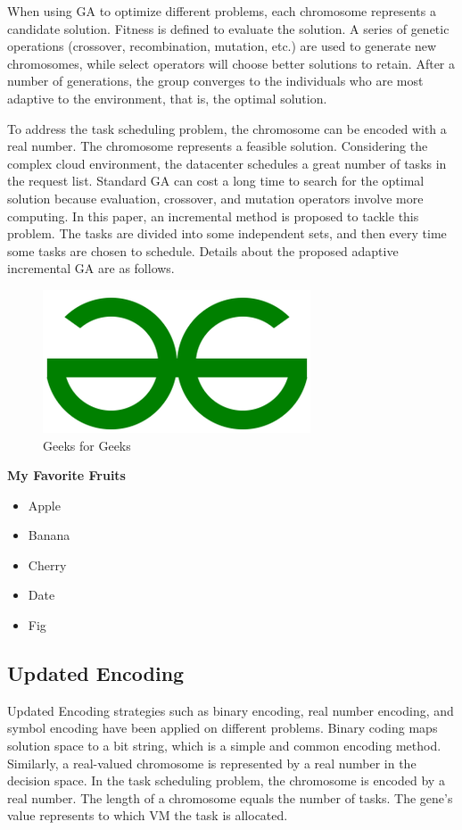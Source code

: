 \documentclass[conference]{IEEEtran}%
\begin{document}
 When using GA to optimize different problems, each chromosome represents a candidate solution. Fitness is defined to evaluate the solution. A series of genetic operations (crossover, recombination, mutation, etc.) are used to generate new chromosomes, while select operators will choose better solutions to retain. After a number of generations, the group converges to the individuals who are most adaptive to the environment, that is, the optimal solution.

 To address the task scheduling problem, the chromosome can be encoded with a real number. The chromosome represents a feasible solution. Considering the complex cloud environment, the datacenter schedules a great number of tasks in the request list. Standard GA can cost a long time to search for the optimal solution because evaluation, crossover, and mutation operators involve more computing. In this paper, an incremental method is proposed to tackle this problem. The tasks are divided into some independent sets, and then every time some tasks are chosen to schedule. Details about the proposed adaptive incremental GA are as follows.


    \begin{figure}[htbp] 
    \centerline{\includegraphics[width=\linewidth]{image_1}}
    \caption{Geeks for Geeks}
    \label{fig:image_1}
    \end{figure} \textbf{My Favorite Fruits}


    \begin{itemize}
        \item Apple
        \item Banana
        \item Cherry
        \item Date
        \item Fig
    \end{itemize}%
\subsection{Updated Encoding}%
\label{subsec:UpdatedEncoding}%
Updated Encoding strategies such as binary encoding, real number encoding, and symbol encoding have been applied on different problems. Binary coding maps solution space to a bit string, which is a simple and common encoding method. Similarly, a real-valued chromosome is represented by a real number in the decision space. In the task scheduling problem, the chromosome is encoded by a real number. The length of a chromosome equals the number of tasks. The gene’s value represents to which VM the task is allocated.
\end{document}

